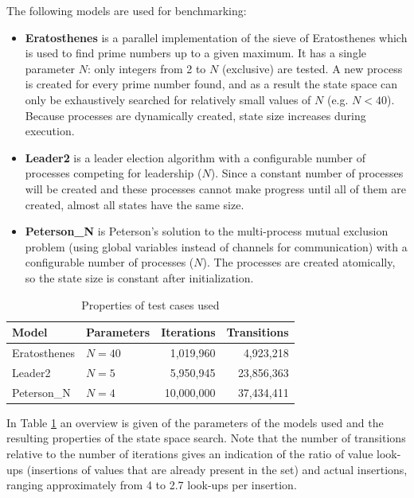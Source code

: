 \documentclass{acm_proc_article-sp}
\begin{document}
The following models are used for benchmarking:
\begin{itemize}
\item\textbf{Eratosthenes} is a parallel implementation of the sieve
of Eratosthenes which is used to find prime numbers up to a given maximum.
It has a single parameter $N$: only integers from 2 to $N$ (exclusive) are
tested. A new process is created for every prime number found, and as a result
the state space can only be exhaustively searched for relatively small values
of $N$ (e.g. $N < 40$). Because processes are dynamically created, state size
increases during execution.

\item\textbf{Leader2} is a leader election algorithm with a configurable number
of processes competing for leadership ($N$). Since a constant number of
processes will be created and these processes cannot make progress until all
of them are created, almost all states have the same size.

\item\textbf{Peterson\_N} is Peterson's solution to the multi-process mutual
exclusion problem (using global variables instead of channels for
communication) with a configurable number of processes ($N$). The processes
are created atomically, so the state size is constant after initialization.
\end{itemize}

\begin{table}
\begin{center}
\begin{tabular}{ l l r r }
\hline
\textbf{Model} & \textbf{Parameters} & \textbf{Iterations} & \textbf{Transitions} \\
\hline
Eratosthenes & $N=40$ &  1,019,960 &  4,923,218 \\
Leader2      & $N=5$  &  5,950,945 & 23,856,363 \\
Peterson\_N  & $N=4$  & 10,000,000 & 37,434,411 \\
\hline
\end{tabular}
\caption{Properties of test cases used}
\label{tab-cases}
\end{center}
\end{table}


In Table \ref{tab-cases} an overview is given of the parameters of the models used
and the resulting properties of the state space search.
Note that the number of transitions relative to the number of iterations gives an
indication of the ratio of value look-ups (insertions of values that are already
present in the set) and actual insertions, ranging approximately from 4 to
2.7 look-ups per insertion.
\end{document}
